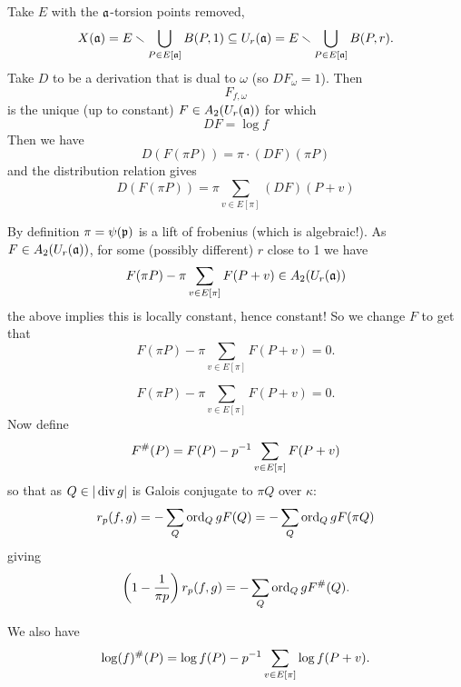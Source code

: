 \begin{frame}
    Take \(E\) with the \(\mathfrak{a}\)-torsion points removed,
\begin{equation*}
X(\mathfrak{a}) = E \smallsetminus \bigcup_{P\in E[\mathfrak{a}]} B(P,1)
\subseteq U_r(\mathfrak{a}) = E \smallsetminus \bigcup_{P\in E[\mathfrak{a}]} B(P, r)\text{.}
\end{equation*}
\pause
Take \(D\) to be a derivation that is dual to \(\omega\) (so \(DF_{\omega} = 1\)). Then%
\begin{equation*}
F_{f,\omega}
\end{equation*}
is the unique (up to constant) \(F \in A_2(U_r(\mathfrak{a}))\) for which%
\begin{equation*}
DF  = \log f
\end{equation*}
Then we have%
\begin{equation*}
D(F(\pi P)) = \pi \cdot (DF)(\pi P)
\end{equation*}
and the distribution relation gives%
\begin{equation*}
D(F(\pi P)) =  \pi \sum_{v\in E[ \pi] } (DF)(P+v)
\end{equation*}

\end{frame}

\begin{frame}
    By definition \(\pi = \psi(\mathfrak{p})\) is a lift of frobenius (which is algebraic!). As \(F \in A_2(U_r(\mathfrak{a}))\), for some (possibly different) \(r\) close to 1 we have
\begin{equation*}
F(\pi P) -  \pi \sum_{v\in E[ \pi] } F(P+v) \in A_2(U_r(\mathfrak{a}))
\end{equation*}
the above implies this is locally constant, hence constant! So we change \(F\) to get that%
\begin{equation*}
F(\pi P) -  \pi \sum_{v\in E[ \pi] } F(P+v)  = 0\text{.}
\end{equation*}

\end{frame}

\begin{frame}
\begin{equation*}
F(\pi P) -  \pi \sum_{v\in E[ \pi] } F(P+v)  = 0\text{.}
\end{equation*}
Now define%
\begin{equation*}
F^\#(P) = F(P) - p^{-1} \sum_{v\in E[\pi]} F(P+v)
\end{equation*}
\pause
so that as \(Q \in |\operatorname{div} g|\) is Galois conjugate to \(\pi Q\) over \(\kappa\):%
\begin{equation*}
r_p(f,g) = - \sum_Q \operatorname{ord}_Q g F(Q) = - \sum_Q \operatorname{ord}_Q g F(\pi Q)
\end{equation*}
giving%
\begin{equation*}
\left( 1 - \frac 1{\pi p}\right) r_p(f,g) = - \sum_Q \operatorname{ord}_Q g F^\# (Q)\text{.}
\end{equation*}

\pause
We also have
\begin{equation*}
\log(f)^\# (P) = \log f(P) - p ^{-1} \sum_{v\in E[\pi ]} \log f(P+v)\text{.}
\end{equation*}
\end{frame}

